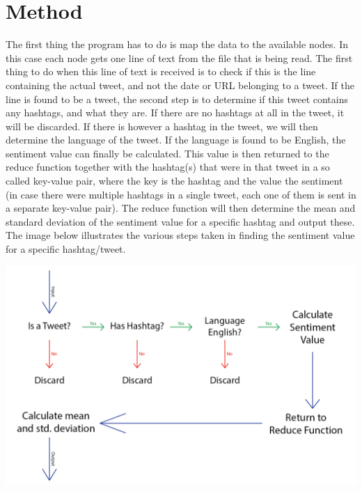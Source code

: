 \documentclass[a4paper,12px]{article}
\begin{document}
\section{Method}

The first thing the program has to do is map the data to the available nodes.
In this case each node gets one line of text from the file that is being read.
The first thing to do when this line of text is received is to check if this is
the line containing the actual tweet, and not the date or URL belonging to a
tweet. If the line is found to be a tweet, the second step is to determine if
this tweet contains any hashtags, and what they are. If there are no hashtags at
all in the tweet, it will be discarded. If there is however a hashtag in the
tweet, we will then determine the language of the tweet. If the language is
found to be English, the sentiment value can finally be calculated. This value
is then returned to the reduce function together with the hashtag(s) that were
in that tweet in a so called key-value pair, where the key is the hashtag and
the value the sentiment (in case there were multiple hashtags in a single tweet,
each one of them is sent in a separate key-value pair).
The reduce function will then determine the mean and standard deviation of the
sentiment value for a specific hashtag and output these.
The image below illustrates the various steps taken in finding the sentiment
value for a specific hashtag/tweet.

\begin{center}
    \includegraphics[width=\textwidth]{steps}
\end{center}
\end{document}
